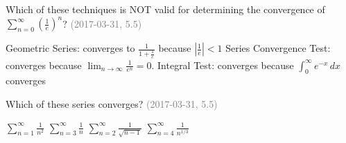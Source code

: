\documentclass[12pt]{exam}
\newcommand{\questionDate}[1]{\textcolor{gray}{(#1)}}
\newcommand{\<}{\langle}
\renewcommand{\>}{\rangle}
\begin{document}
\begin{questions}
\newpage

\question
Which of these techniques is NOT valid for determining the convergence
of \(\displaystyle\sum_{n=0}^\infty \left(\frac{1}{e}\right)^n\)?
\questionDate{2017-03-31, 5.5}
\begin{choices}
\choice
  Geometric Series: converges to \(\frac{1}{1+\frac{1}{e}}\)
  because \(|\frac{1}{e}|<1\)
\CorrectChoice
  Series Convergence Test: converges because
  \(\displaystyle\lim_{n\to\infty}\frac{1}{e^n}=0\).
\choice
  Integral Test: converges because \(\int_0^\infty e^{-x}\,dx\) converges
\end{choices}

\question
Which of these series converges?
\questionDate{2017-03-31, 5.5}
\begin{choices}
\CorrectChoice
  \(\displaystyle\sum_{n=1}^\infty\frac{1}{n^2}\)
\choice
  \(\displaystyle\sum_{n=3}^\infty\frac{1}{n}\)
\choice
  \(\displaystyle\sum_{n=2}^\infty\frac{1}{\sqrt{n-1}}\)
\choice
  \(\displaystyle\sum_{n=4}^\infty\frac{1}{n^{1/3}}\)
\end{choices}


\end{questions}
\end{document}
